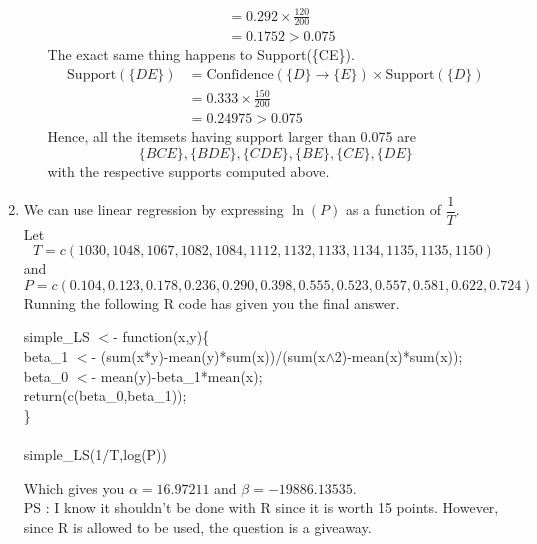 \documentclass{article}
\begin{document}
\begin{enumerate}
\begin{enumerate}
\begin{align*}
            &= 0.292 \times \frac{120}{200}\\
            &= 0.1752 > 0.075
        \end{align*}
        The exact same thing happens to Support(\{CE\}).\\
        \begin{align*}
            \text{Support}(\{DE\}) &= \text{Confidence}(\{D\} \rightarrow \{E\}) \times \text{Support}(\{D\})\\
            &= 0.333 \times \frac{150}{200}\\
            &= 0.24975 > 0.075
        \end{align*}
        Hence, all the itemsets having support larger than 0.075 are
        \[\{BCE\},\{BDE\},\{CDE\},\{BE\},\{CE\},\{DE\}\]
        with the respective supports computed above.
    \end{enumerate}
    
    \item We can use linear regression by expressing $\ln(P)$ as a function of $\dfrac{1}{T}$.\\
    Let \[T=c(1030,1048,1067,1082,1084,1112,1132,1133,1134,1135,1135,1150)\]
    and \[P=c(0.104,0.123,0.178,0.236,0.290,0.398,0.555,0.523,0.557,0.581,0.622,0.724)\]
    Running the following R code has given you the final answer.\\
    \begin{tcolorbox}[colback=blue!10, colframe=blue]
    simple\_LS $<$- function(x,y)\{\\
    \hspace{1 cm}beta\_1 $<$- (sum(x*y)-mean(y)*sum(x))/(sum(x$\wedge$2)-mean(x)*sum(x));\\
	\hspace{5 mm}beta\_0 $<$- mean(y)-beta\_1*mean(x);\\
	\hspace{5 mm}return(c(beta\_0,beta\_1));\\
    \}\\\\
    simple\_LS(1/T,log(P))
    \end{tcolorbox}
    Which gives you $\alpha=16.97211$ and $\beta=-19886.13535$.\\
    PS : I know it shouldn't be done with R since it is worth 15 points. However, since R is allowed to be used, the question is a giveaway.
    

\end{enumerate}
\end{document}

